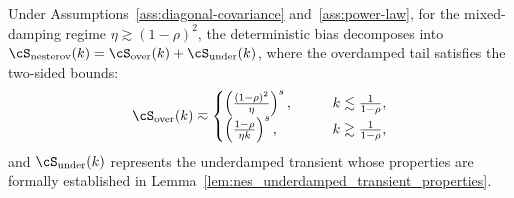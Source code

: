 \documentclass[11pt]{article}
\newcommand{\nesterov}{\mathrm{nesterov}}
\begin{document}
\begin{proposition}
\label{prop:nes_deterministic_bias}
Under Assumptions~\ref{ass:diagonal-covariance} and~\ref{ass:power-law}, for the mixed-damping regime \(\eta\gtrsim(1-\rho)^2\), the deterministic bias decomposes into $\cS_{\nesterov}(k) = \cS_{\mathrm{over}}(k) + \cS_{\mathrm{under}}(k)$, where the overdamped tail satisfies the two-sided bounds:
\begin{equation*}
    \cS_{\mathrm{over}}(k)
    \eqsim
    \begin{cases}
    \left(\frac{(1-\rho)^2}{\eta}\right)^s, &\qquad k\lesssim\frac{1}{1-\rho},\\
    \left(\frac{1-\rho}{\eta k}\right)^s, &\qquad k\gtrsim\frac{1}{1-\rho},
    \end{cases}
\end{equation*}
and $\cS_{\mathrm{under}}(k)$ represents the underdamped transient whose properties are formally established in Lemma~\ref{lem:nes_underdamped_transient_properties}.
\end{proposition}
\end{document}
